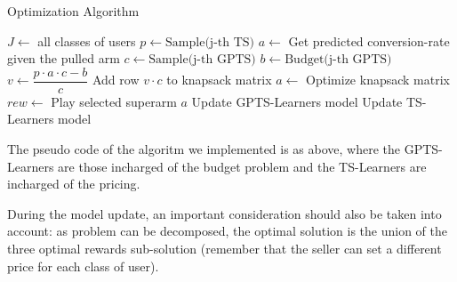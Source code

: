 \begin{algorithm}
	\renewcommand{\algorithmiccomment}[2][.4\linewidth]{%
		\leavevmode\hfill\makebox[#1][l]{//~#2}}
	\caption{Optimization Algorithm}
	\begin{algorithmic}[1]
		\STATE $J\gets ${ all classes of users}
		\STATE $p \leftarrow \text{Sample(j-th TS)}$
		\STATE $a \leftarrow$ Get predicted conversion-rate given the pulled arm
		\STATE $c \leftarrow \text{Sample(j-th GPTS)}$
		\STATE $b \leftarrow \text{Budget(j-th GPTS)}$
		\STATE $v \leftarrow \dfrac{p\cdot a\cdot c - b}{c}$
		\STATE Add row $v\cdot c$ to knapsack matrix
		\ENDFOR
		\STATE $a \leftarrow$ Optimize knapsack matrix
		\STATE $rew \leftarrow $ Play selected superarm $a$
		\STATE Update GPTS-Learners model
		\STATE Update TS-Learners model
		\ENDFOR
	\end{algorithmic}
\end{algorithm}
The pseudo code of the algoritm we implemented is as above, where the GPTS-Learners are those incharged of the budget problem and the TS-Learners are incharged of the pricing.

During the model update, an important consideration should also be taken into account: as problem can be decomposed, the optimal solution is the union of the three optimal rewards sub-solution (remember that the seller can set a different price for each class of user).
